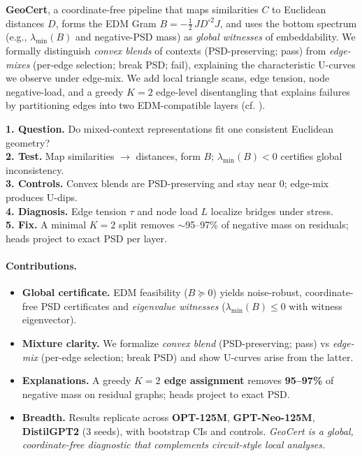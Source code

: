 \documentclass[11pt]{article}
\newcommand{\1}{\mathbf{1}}
\newcommand{\PSD}{\succeq 0}
\begin{document}
\noindent\textbf{GeoCert}, a coordinate-free pipeline that maps similarities $C$ to Euclidean distances $D$, forms the EDM Gram $B=-\tfrac12\,J D^{\circ2} J$, and uses the bottom spectrum (e.g., $\lambda_{\min}(B)$ and negative-PSD mass) as \emph{global witnesses} of embeddability. We formally distinguish \emph{convex blends} of contexts (PSD-preserving; pass) from \emph{edge-mixes} (per-edge selection; break PSD; fail), explaining the characteristic U-curves we observe under edge-mix. We add local triangle scans, edge tension, node negative-load, and a greedy $K{=}2$ edge-level disentangling that explains failures by partitioning edges into two EDM-compatible layers (cf. \citep{schoenberg1938,gower1985,LibertiLavor2017,Dokmanic2015}).

\begin{tcolorbox}[colback=gray!5!white,colframe=gray!75!black,title=How to read GeoCert]
\textbf{1. Question.} Do mixed-context representations fit one consistent Euclidean geometry?\\
\textbf{2. Test.} Map similarities $\to$ distances, form $B$; $\lambda_{\min}(B){<}0$ certifies global inconsistency.\\
\textbf{3. Controls.} Convex blends are PSD-preserving and stay near $0$; edge-mix produces U-dips.\\
\textbf{4. Diagnosis.} Edge tension $\tau$ and node load $L$ localize bridges under stress.\\
\textbf{5. Fix.} A minimal $K{=}2$ split removes $\sim$95--97\% of negative mass on residuals; heads project to exact PSD per layer.
\end{tcolorbox}

\paragraph{Contributions.}
\begin{itemize}[leftmargin=1.5em]
\item \textbf{Global certificate.} EDM feasibility ($B \PSD$) yields noise-robust, coordinate-free PSD certificates and \emph{eigenvalue witnesses} ($\lambda_{\min}(B)\le 0$ with witness eigenvector).
\item \textbf{Mixture clarity.} We formalize \emph{convex blend} (PSD-preserving; pass) vs \emph{edge-mix} (per-edge selection; break PSD) and show U-curves arise from the latter.
\item \textbf{Explanations.} A greedy \textbf{$K{=}2$ edge assignment} removes \textbf{95--97\%} of negative mass on residual graphs; heads project to exact PSD.
\item \textbf{Breadth.} Results replicate across \textbf{OPT-125M}, \textbf{GPT-Neo-125M}, \textbf{DistilGPT2} (3 seeds), with bootstrap CIs and controls. \emph{GeoCert is a global, coordinate-free diagnostic that complements circuit-style local analyses.}
\end{itemize}
\end{document}
